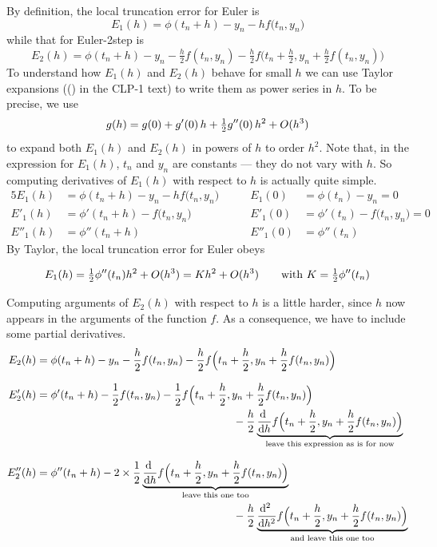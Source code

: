By definition, the local truncation error for Euler is
\begin{equation*}
E_1(h)=\phi(t_n+h)-y_n-hf\big(t_n,y_n\big) 
\end{equation*}
while that for Euler-2step is
\begin{equation*}
E_2(h)=\phi(t_n+h)-y_n-\tfrac{h}{2}f(t_n,y_n)
-\tfrac{h}{2}f\big(t_n+\tfrac{h}{2},y_n+\tfrac{h}{2}f(t_n,y_n)\big)
\end{equation*}
To understand how $E_1(h)$ and $E_2(h)$ behave for small $h$ we can use Taylor expansions (() in the CLP-1 text) to write them as power series in $h$. To be precise, we use
\begin{equation*}
g(h)=g(0)+g'(0)\,h+\tfrac{1}{2} g''(0)\,h^2+O(h^3)
\end{equation*}
to expand both $E_1(h)$ and $E_2(h)$ in powers of $h$ to order $h^2$.
Note that, in the expression for $E_1(h)$,  $t_n$ and $y_n$ are constants ---
they do not vary with $h$. So computing derivatives of $E_1(h)$ with
respect to $h$ is actually quite simple.
\begin{alignat*}{5}
E_1(h)&=\phi(t_n+h)-y_n-hf\big(t_n,y_n\big)\qquad &
             E_1(0)&=\phi(t_n)-y_n=0 \\
E'_1(h)&=\phi'(t_n+h)-f\big(t_n,y_n\big) &
         E'_1(0)&=\phi'(t_n)-f\big(t_n,y_n\big)=0 \\
E''_1(h)&=\phi''(t_n+h) &
         E''_1(0)&=\phi''(t_n) 
\end{alignat*}
By Taylor, the local truncation error for Euler obeys
\begin{impeqn}\label{Euler 1step}
\begin{equation*}
E_1(h)=\tfrac{1}{2}\phi''(t_n)h^2+O(h^3)=Kh^2+O(h^3)\qquad\text{with }
                      K=\tfrac{1}{2}\phi''(t_n)
\end{equation*}
\end{impeqn}
Computing arguments of $E_2(h)$ with respect to $h$ is a little harder, since $h$ now appears in the arguments of the function $f$. As a consequence, we have to include some partial derivatives.
\begin{align*}
E_2(h)&=\phi(t_n+h)-y_n-\frac{h}{2}f(t_n,y_n)
     -\frac{h}{2}f\Big(t_n+\frac{h}{2},y_n+\frac{h}{2}f(t_n,y_n)\Big) 
\\[0.1in]
E'_2(h)&=\phi'(t_n+h)-\frac{1}{2}f(t_n,y_n)
-\frac{1}{2}f\Big(t_n+\frac{h}{2},y_n+\frac{h}{2}f(t_n,y_n)\Big) \\
&\hskip2.5in-\frac{h}{2}
\underbrace{\diff{}{h} f\Big(t_n+\frac{h}{2},y_n+\frac{h}{2}f(t_n,y_n)
     \Big)}_{\text{leave this expression as is for now}}  
\\[0.1in]
E''_2(h)&=\phi''(t_n+h)
-2\times\frac{1}{2}
\underbrace{\diff{}{h} f\Big(t_n+\frac{h}{2},y_n+\frac{h}{2}f(t_n,y_n)
      \Big)}_{\text{leave this one too}} \\
&\hskip2.5in-\frac{h}{2}
\underbrace{\difftwo{}{h}f\Big(t_n+\frac{h}{2},y_n+\frac{h}{2}f(t_n,y_n)
      \Big)}_{\text{and leave this one too}}
\end{align*}

